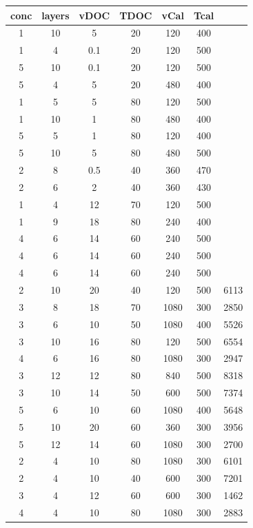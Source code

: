 \documentclass[a4paper]{article}
\begin{document}
\begin{table}
	\centering
	\begin{tabular}{ccccccc}
		\hline
		\hline
conc	&layers	&vDOC	&TDOC	&vCal	&Tcal	&	\\
		\hline
1	&10	&5	&20	&120	&400	&\\
1	&4	&0.1	&20	&120	&500	&\\
5	&10	&0.1	&20	&120	&500	&\\
5	&4	&5	&20	&480	&400	&\\
1	&5	&5	&80	&120	&500	&\\
1	&10	&1	&80	&480	&400	&\\
5	&5	&1	&80	&120	&400	&\\
5	&10	&5	&80	&480	&500	&\\
2	&8	&0.5	&40	&360	&470	&\\
2	&6	&2	&40	&360	&430	&\\
		\hline
1	&4	&12	&70	&120	&500	&\\
1	&9	&18	&80	&240	&400	&\\
4	&6	&14	&60	&240	&500	&\\
4	&6	&14	&60	&240	&500	&\\
4	&6	&14	&60	&240	&500	&\\
		\hline
2	&10	&20	&40	&120	&500	&6113\\
3	&8	&18	&70	&1080	&300	&2850\\
3	&6	&10	&50	&1080	&400	&5526	\\
3	&10	&16	&80	&120	&500	&6554	\\
4	&6	&16	&80	&1080	&300	&2947	\\
3	&12	&12	&80	&840	&500	&8318	\\
3	&10	&14	&50	&600	&500	&7374	\\
5	&6	&10	&60	&1080	&400	&5648	\\
5	&10	&20	&60	&360	&300	&3956	\\
5	&12	&14	&60	&1080	&300	&2700	\\
		\hline
2	&4	&10	&80	&1080	&300	&6101	\\
2	&4	&10	&40	&600	&300	&7201	\\
3	&4	&12	&60	&600	&300	&1462	\\
4	&4	&10	&80	&1080	&300	&2883	\\

\end{tabular}
\end{table}
\end{document}
